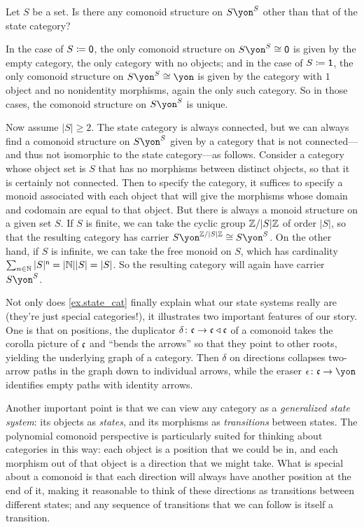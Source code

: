 \documentclass[Book-Poly]{subfiles}
\begin{document}
\begin{exercise} \label{exc.not_state_cat_but_same_carrier}
Let $S$ be a set. Is there any comonoid structure on $S\yon^S$ other than that of the state category?
\begin{solution}
In the case of $S\coloneqq\textsf{0}$, the only comonoid structure on $S\yon^S\iso\0$ is given by the empty category, the only category with no objects; and in the case of $S\coloneqq\textsf{1}$, the only comonoid structure on $S\yon^S\iso\yon$ is given by the category with $1$ object and no nonidentity morphisms, again the only such category.
So in those cases, the comonoid structure on $S\yon^S$ is unique.

Now assume $|S|\geq2$.
The state category is always connected, but we can always find a comonoid structure on $S\yon^S$ given by a category that is not connected---and thus not isomorphic to the state category---as follows.
Consider a category whose object set is $S$ that has no morphisms between distinct objects, so that it is certainly not connected.
Then to specify the category, it suffices to specify a monoid associated with each object that will give the morphisms whose domain and codomain are equal to that object.
But there is always a monoid structure on a given set $S$.
If $S$ is finite, we can take the cyclic group $\mathbb{Z}/|S|\mathbb{Z}$ of order $|S|$, so that the resulting category has carrier $S\yon^{\zz/|S|\zz}\iso S\yon^S$.
On the other hand, if $S$ is infinite, we can take the free monoid on $S$, which has cardinality $\sum_{n\in\mathbb{N}}|S|^{\mathsf{n}}=|\mathbb{N}||S|=|S|$.
So the resulting category will again have carrier $S\yon^S$.
\end{solution}
\end{exercise}

Not only does \cref{ex.state_cat} finally explain what our state systems really are (they're just special categories!), it illustrates two important features of our story.
One is that on positions, the duplicator $\delta\colon\mathfrak{c}\to\mathfrak{c}\mathbin{\triangleleft}\mathfrak{c}$ of a comonoid takes the corolla picture of $\mathfrak{c}$ and ``bends the arrows'' so that they point to other roots, yielding the underlying graph of a category.
Then $\delta$ on directions collapses two-arrow paths in the graph down to individual arrows, while the eraser $\epsilon\colon\ema{c}\to\yon$ identifies empty paths with identity arrows.

Another important point is that we can view any category as a \emph{generalized state system}: its objects as \emph{states}, and its morphisms as \emph{transitions} between states.
The polynomial comonoid perspective is particularly suited for thinking about categories in this way: each object is a position that we could be in, and each morphism out of that object is a direction that we might take.
What is special about a comonoid is that each direction will always have another position at the end of it, making it reasonable to think of these directions as transitions between different states; and any sequence of transitions that we can follow is itself a transition.
\end{document}
